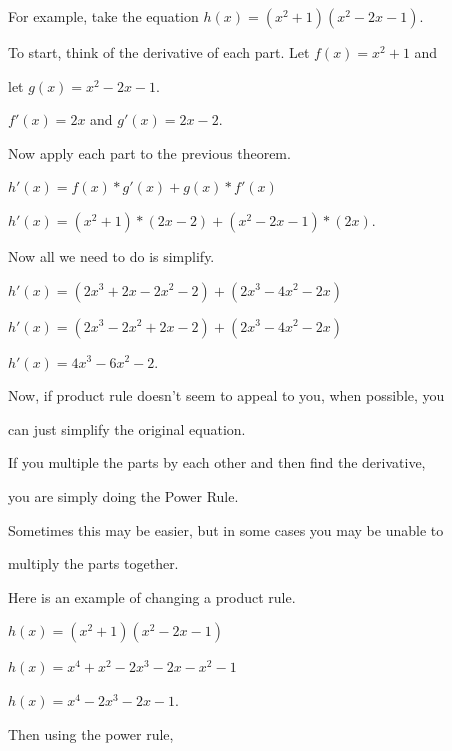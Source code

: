 {{{{For example, take the equation $h(x)=(x^2 + 1)(x^2 - 2x - 1).$



To start, think of the derivative of each part. Let $f(x) = x^2 + 1$ and

let $g(x) = x^2 - 2x -1.$



$f'(x) = 2x$ and $g'(x) = 2x - 2.$



Now apply each part to the previous theorem.



$h'(x) = f(x) * g'(x) + g(x) * f'(x)$



$h'(x) = (x^2 + 1) * (2x-2) + (x^2 - 2x - 1) * (2x).$



Now all we need to do is simplify.



$h'(x) = (2x^3 + 2x -2x^2 -2) + (2x^3 - 4x^2 - 2x)$



$h'(x) = (2x^3 - 2x^2 + 2x - 2) + (2x^3 - 4x^2 - 2x)$



$h'(x) = 4x^3 - 6x^2 - 2.$



Now, if product rule doesn't seem to appeal to you, when possible, you

can just simplify the original equation.



If you multiple the parts by each other and then find the derivative,

you are simply doing the Power Rule.



Sometimes this may be easier, but in some cases you may be unable to

multiply the parts together.



Here is an example of changing a product rule.



$h(x) = (x^2 + 1)(x^2 - 2x - 1)$



$h(x) = x^4 + x^2 -2x^3 - 2x - x^2 - 1$



$h(x) = x^4 - 2x^3 - 2x - 1.$



Then using the power rule,



}}}}
